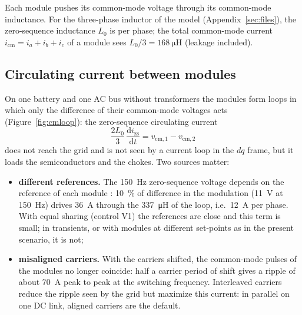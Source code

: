 \documentclass[11pt,a4paper]{scrartcl}
\newcommand{\ped}[1]{_{\mathrm{#1}}}
\newcommand{\dif}{\mathrm{d}}
\begin{document}
\begin{onehalfspace}
Each module pushes its common-mode voltage through its common-mode inductance. For the three-phase inductor of the model (Appendix~\ref{sec:files}), the zero-sequence inductance $L_0$ is per phase; the total common-mode current $i\ped{cm} = i_a + i_b + i_c$ of a module sees $L_0/3 = \SI{168}{\micro\henry}$ (leakage included).

\subsection{Circulating current between modules}

On one battery and one AC bus without transformers the modules form loops in which only the difference of their common-mode voltages acts (Figure~\ref{fig:cmloop}): the zero-sequence circulating current
\begin{equation}
	\frac{2L_0}{3}\,\frac{\dif i\ped{zs}}{\dif t} = v\ped{cm,1} - v\ped{cm,2}
	\label{eq:zscc}
\end{equation}
does not reach the grid and is not seen by a current loop in the $dq$ frame, but it loads the semiconductors and the chokes. Two sources matter:

\begin{itemize}[nosep]
	\item \textbf{different references.} The \SI{150}{Hz} zero-sequence voltage depends on the reference of each module \cite{zhu2017}: \SI{10}{\percent} of difference in the modulation (11~V at \SI{150}{Hz}) drives \SI{36}{A} through the \SI{337}{\micro\henry} of the loop, i.e.\ \SI{12}{A} per phase. With equal sharing (control V1) the references are close and this term is small; in transients, or with modules at different set-points as in the present scenario, it is not;
	\item \textbf{misaligned carriers.} With the carriers shifted, the common-mode pulses of the modules no longer coincide: half a carrier period of shift gives a ripple of about \SI{70}{A} peak to peak at the switching frequency. Interleaved carriers reduce the ripple seen by the grid \cite{modularity_note} but maximize this current: in parallel on one DC link, aligned carriers are the default.
\end{itemize}


\end{onehalfspace}
\end{document}

